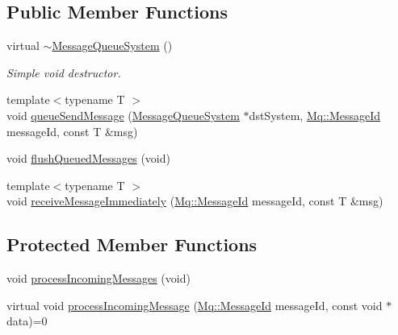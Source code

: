 \subsection*{Public Member Functions}
\begin{DoxyCompactItemize}
\item 
\mbox{\label{class_common_1_1_mq_1_1_message_queue_system_a0b823b0430b6d72c503ee6dcd72f93d7}} 
virtual \hyperlink{class_common_1_1_mq_1_1_message_queue_system_a0b823b0430b6d72c503ee6dcd72f93d7}{$\sim$\+Message\+Queue\+System} ()
\begin{DoxyCompactList}\small\item\em Simple void destructor. \end{DoxyCompactList}\item 
{\footnotesize template$<$typename T $>$ }\\void \hyperlink{class_common_1_1_mq_1_1_message_queue_system_ab9a6196ad22221175ec636ea2b08ec5d}{queue\+Send\+Message} (\hyperlink{class_common_1_1_mq_1_1_message_queue_system}{Message\+Queue\+System} $\ast$dst\+System, \hyperlink{group___common_gaa8c87d2b450282716c906da283e149e6}{Mq\+::\+Message\+Id} message\+Id, const T \&msg)
\item 
void \hyperlink{class_common_1_1_mq_1_1_message_queue_system_a6294a354a094e6ae8fc53e6b936d1963}{flush\+Queued\+Messages} (void)
\item 
{\footnotesize template$<$typename T $>$ }\\void \hyperlink{class_common_1_1_mq_1_1_message_queue_system_a82f4a342971fc840169465d29b78b02f}{receive\+Message\+Immediately} (\hyperlink{group___common_gaa8c87d2b450282716c906da283e149e6}{Mq\+::\+Message\+Id} message\+Id, const T \&msg)
\end{DoxyCompactItemize}
\subsection*{Protected Member Functions}
\begin{DoxyCompactItemize}
\item 
void \hyperlink{class_common_1_1_mq_1_1_message_queue_system_abc956172e5948e71547202f429e5e505}{process\+Incoming\+Messages} (void)
\item 
virtual void \hyperlink{class_common_1_1_mq_1_1_message_queue_system_ad6eb849b72f03e3e4f09c6457c8ecda6}{process\+Incoming\+Message} (\hyperlink{group___common_gaa8c87d2b450282716c906da283e149e6}{Mq\+::\+Message\+Id} message\+Id, const void $\ast$data)=0
\end{DoxyCompactItemize}
